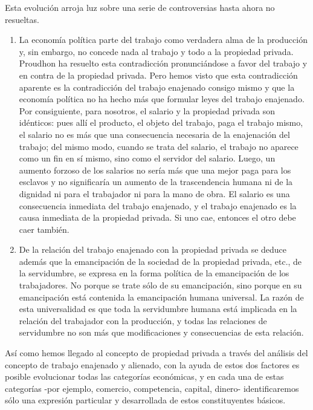 Esta evolución arroja luz sobre una serie de controversias hasta ahora no resueltas.


\begin{enumerate}[(1)]
    \item La economía política parte del trabajo como verdadera alma de la producción y, sin embargo, no concede nada al trabajo y todo a la propiedad privada. Proudhon ha resuelto esta contradicción pronunciándose a favor del trabajo y en contra de la propiedad privada. Pero hemos visto que esta contradicción aparente es la contradicción del trabajo enajenado consigo mismo y que la economía política no ha hecho más que formular leyes del trabajo enajenado. Por consiguiente, para nosotros, el salario y la propiedad privada son idénticos: pues allí el producto, el objeto del trabajo, paga el trabajo mismo, el salario no es más que una consecuencia necesaria de la enajenación del trabajo; del mismo modo, cuando se trata del salario, el trabajo no aparece como un fin en sí mismo, sino como el servidor del salario. Luego, un aumento forzoso de los salarios no sería más que una mejor paga para los esclavos y no significaría un aumento de la  trascendencia humana ni de la dignidad ni para el trabajador ni para la mano de obra. El salario es una consecuencia inmediata del trabajo enajenado, y el trabajo enajenado es la causa inmediata de la propiedad privada. Si uno cae, entonces el otro debe caer también.
    \item De la relación del trabajo enajenado con la propiedad privada se deduce además que la emancipación de la sociedad de la propiedad privada, etc., de la servidumbre, se expresa en la forma política de la emancipación de los trabajadores. No porque se trate sólo de su emancipación, sino porque en su emancipación está contenida la emancipación humana universal. La razón de esta universalidad es que toda la servidumbre humana está implicada en la relación del trabajador con la producción, y todas las relaciones de servidumbre no son más que modificaciones y consecuencias de esta relación.
\end{enumerate}

Así como hemos llegado al concepto de propiedad privada a través del análisis del concepto de trabajo enajenado y alienado, con la ayuda de estos dos factores es posible evolucionar todas las categorías económicas, y en cada una de estas categorías -por ejemplo, comercio, competencia, capital, dinero- identificaremos sólo una expresión particular y desarrollada de estos constituyentes básicos. 

